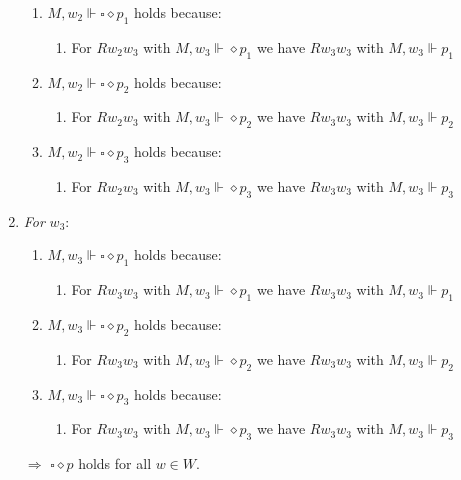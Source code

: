 \documentclass{report}
\begin{document}
\begin{enumerate}[]
			\begin{enumerate}[]
				\item $M, w_2 \Vdash \square \diamond p_1$ holds because:
				\begin{enumerate}[]
					\item For $Rw_2w_3$ with $M,w_3 \Vdash \diamond p_1$ we have $Rw_3w_3$ with $M, w_3 \Vdash p_1$
				\end{enumerate}
				\item $M, w_2 \Vdash \square \diamond p_2$ holds because:
				\begin{enumerate}[]
					\item For $Rw_2w_3$ with $M,w_3 \Vdash \diamond p_2$ we have $Rw_3w_3$ with $M, w_3 \Vdash p_2$
				\end{enumerate}
				\item $M, w_2 \Vdash \square \diamond p_3$ holds because:
				\begin{enumerate}[]
					\item For $Rw_2w_3$ with $M,w_3 \Vdash \diamond p_3$ we have $Rw_3w_3$ with $M, w_3 \Vdash p_3$
				\end{enumerate}
			\end{enumerate}
			\item \textit{For} $w_3$:
			\begin{enumerate}[]
				\item $M, w_3 \Vdash \square \diamond p_1$ holds because:
				\begin{enumerate}[]
					\item For $Rw_3w_3$ with $M,w_3 \Vdash \diamond p_1$ we have $Rw_3w_3$ with $M, w_3 \Vdash p_1$
				\end{enumerate}
				\item $M, w_3 \Vdash \square \diamond p_2$ holds because:
				\begin{enumerate}[]
					\item For $Rw_3w_3$ with $M,w_3 \Vdash \diamond p_2$ we have $Rw_3w_3$ with $M, w_3 \Vdash p_2$
				\end{enumerate}
				\item $M, w_3 \Vdash \square \diamond p_3$ holds because:
				\begin{enumerate}[]
					\item For $Rw_3w_3$ with $M,w_3 \Vdash \diamond p_3$ we have $Rw_3w_3$ with $M, w_3 \Vdash p_3$
				\end{enumerate}
			\end{enumerate}
			$\Rightarrow$ $\square \diamond p$ holds for all $w \in W$. 
		\end{enumerate}
	
\end{document}
